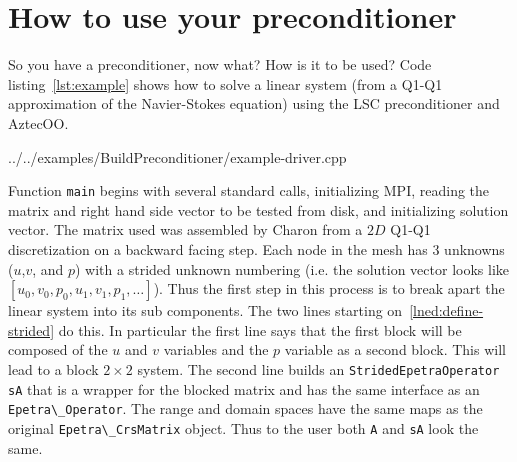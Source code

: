\documentclass[12pt]{article}
\newcommand{\code}[1]{\lstinline[basicstyle=\footnotesize]!#1!}
\begin{document}
\section{How to use your preconditioner}\label{sec:use-prec}
So you have a preconditioner, now what? How is it to be used? Code listing~\ref{lst:example}
shows how to solve a linear system (from a Q1-Q1 approximation of the Navier-Stokes equation)
using the LSC preconditioner and AztecOO.

\begin{framed}

   {../../examples/BuildPreconditioner/example-driver.cpp}
\end{framed}

Function \code{main} begins with several standard calls, initializing MPI, 
reading the matrix and right hand side vector to be tested from disk, and initializing solution
vector. The matrix used was assembled by Charon from a $2D$ Q1-Q1 discretization on a 
backward facing step. Each node in the mesh has $3$ unknowns ($u$,$v$, and $p$)
with a strided unknown numbering (i.e. the solution vector looks like
$[u_0,v_0,p_0,u_1,v_1,p_1,\ldots]$). Thus the first step in this process is
to break apart the linear system into its sub components.  The two lines starting
on~\ref{lned:define-strided} do this. In particular the first line says
that the first block will be composed of the $u$ and $v$ variables
and the $p$ variable as a second block. This will lead to a block $2\times 2$
system. The second line builds an \code{StridedEpetraOperator} \code{sA} that is a wrapper for
the blocked matrix and has the same interface as an \code{Epetra\_Operator}. The range and
domain spaces have the same maps as the original \code{Epetra\_CrsMatrix} object. Thus to the user both
\code{A} and \code{sA} look the same.
\end{document}
